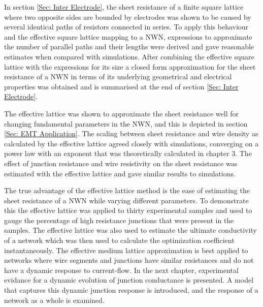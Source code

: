 In section \ref{Sec: Inter Electrode}, the sheet resistance of a finite square lattice where two opposite sides are bounded by electrodes was shown to be caused by several identical paths of resistors connected in series. To apply this behaviour and the effective square lattice mapping to a NWN, expressions to approximate the number of parallel paths and their lengths were derived and gave reasonable estimates when compared with simulations. After combining the effective square lattice with the expressions for its size a closed form approximation for the sheet resistance of a NWN in terms of its underlying geometrical and electrical properties was obtained and is summarised at the end of section \ref{Sec: Inter Electrode}. 

The effective lattice was shown to approximate the sheet resistance well for changing fundamental parameters in the NWN, and this is depicted in section \ref{Sec: EMT Application}. The scaling between sheet resistance and wire density as calculated by the effective lattice agreed closely with simulations, converging on a power law with an exponent that was theoretically calculated in chapter 3. The effect of junction resistance and wire resistivity on the sheet resistance was estimated with the effective lattice and gave similar results to simulations. 

The true advantage of the effective lattice method is the ease of estimating the sheet resistance of a NWN while varying different parameters. To demonstrate this the effective lattice was applied to thirty experimental samples and used to gauge the percentage of high resistance junctions that were present in the samples. The effective lattice was also used to estimate the ultimate conductivity of a network which was then used to calculate the optimization coefficient instantaneously. The effective medium lattice approximation is best applied to networks where wire segments and junctions have similar resistances and do not have a dynamic response to current-flow. In the next chapter, experimental evidance for a dynamic evolution of junction conductance is presented. A model that captures this dynamic junction response is introduced, and the response of a network as a whole is examined.
%
